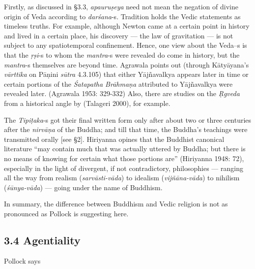 Firstly, as discussed in §3.3, \textit{apauruṣeya} need not mean the negation of divine origin of Veda according to \textit{darśana}-s. Tradition holds the Vedic statements as timeless truths. For example, although Newton came at a certain point in history and lived in a certain place, his discovery — the law of gravitation — is not subject to any spatiotemporal confinement. Hence, one view about the Veda--s is that the \textit{ṛṣi}-s to whom the \textit{mantra}-s were revealed do come in history, but the \textit{mantra}-s themselves are beyond time. Agrawala points out (through Kātyāyana’s \textit{vārttika} on Pāṇini \textit{sūtra }4.3.105) that either Yājñavalkya appears later in time or certain portions of the \textit{Śatapatha Brāhmaṇa }attributed to Yājñavalkya were revealed later. (Agrawala 1953: 329-332) Also, there are studies on the \textit{Ṛgveda} from a historical angle by (Talageri 2000), for example.

The \textit{Tipiṭaka}-s got their final written form only after about two or three centuries after the \textit{nirvāṇa }of the Buddha; and till that time, the Buddha’s teachings were transmitted orally [see §2]. Hiriyanna opines that the Buddhist canonical literature “may contain much that was actually uttered by Buddha; but there is no means of knowing for certain what those portions are” (Hiriyanna 1948: 72), especially in the light of divergent, if not contradictory, philosophies — ranging all the way from realism (\textit{sarvāsti-vāda}) to idealism (\textit{vijñāna-vāda}) to nihilism (\textit{śūnya-vāda}) — going under the name of Buddhism.

In summary, the difference between Buddhism and Vedic religion is not as pronounced as Pollock is suggesting here.


\subsection*{3.4 Agentiality}

Pollock says

